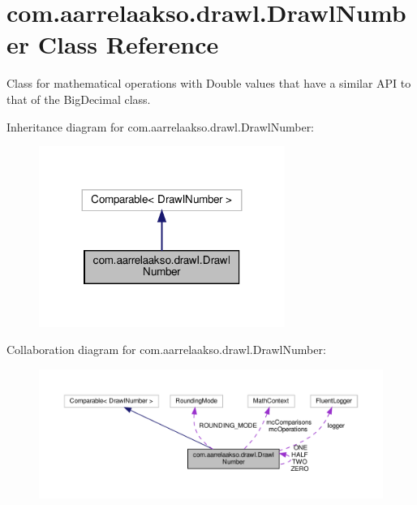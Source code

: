 \hypertarget{classcom_1_1aarrelaakso_1_1drawl_1_1_drawl_number}{}\section{com.\+aarrelaakso.\+drawl.\+Drawl\+Number Class Reference}
\label{classcom_1_1aarrelaakso_1_1drawl_1_1_drawl_number}


Class for mathematical operations with Double values that have a similar A\+PI to that of the Big\+Decimal class.  




Inheritance diagram for com.\+aarrelaakso.\+drawl.\+Drawl\+Number\+:
\nopagebreak
\begin{figure}[H]
\begin{center}
\leavevmode
\includegraphics[width=227pt]{d2/dc2/classcom_1_1aarrelaakso_1_1drawl_1_1_drawl_number__inherit__graph}
\end{center}
\end{figure}


Collaboration diagram for com.\+aarrelaakso.\+drawl.\+Drawl\+Number\+:
\nopagebreak
\begin{figure}[H]
\begin{center}
\leavevmode
\includegraphics[width=350pt]{dd/d28/classcom_1_1aarrelaakso_1_1drawl_1_1_drawl_number__coll__graph}
\end{center}
\end{figure}
